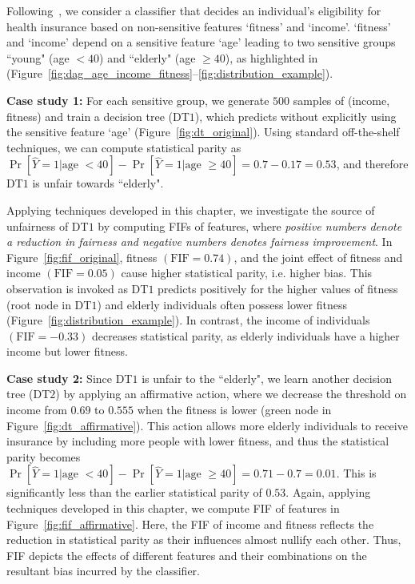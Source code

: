 \begin{example}
	\normalfont
	\label{ex:motivating_example}
 Following~\cite{ghosh2020justicia}, we consider a classifier that decides an individual's eligibility for health insurance based on non-sensitive features `fitness' and `income'.
	`fitness' and `income' depend on a sensitive feature `age' leading to two sensitive groups ``young" (age $ < 40 $) and ``elderly" (age $ \ge 40 $), as highlighted in (Figure~\ref{fig:dag_age_income_fitness}--\ref{fig:distribution_example}). 
	
	\textbf{Case study 1:} For each sensitive group, we generate $ 500 $ samples of (income, fitness) and train a decision tree (DT$ 1 $), which predicts without explicitly using the sensitive feature `age' (Figure~\ref{fig:dt_original}). %
	Using standard off-the-shelf techniques, we can compute statistical parity as $ \Pr[\widehat{Y} = 1 | \text{age } < 40] - \Pr[\widehat{Y} = 1 | \text{age } \ge 40] = 0.7 - 0.17 = 0.53 $, and therefore DT$ 1 $ is unfair towards ``elderly".
	
	Applying techniques developed in this chapter, we  investigate the source of unfairness of DT$ 1 $ by computing FIFs of features, where \emph{positive numbers denote a reduction in fairness and negative numbers denotes fairness improvement}. In Figure~\ref{fig:fif_original}, fitness $(\mathrm{FIF} = 0.74)$, and the joint effect of fitness and income $(\mathrm{FIF}  = 0.05)$ cause higher statistical parity, i.e. higher bias. This observation is invoked as DT$ 1 $ predicts positively for the higher values of fitness (root node in DT$ 1 $) and elderly individuals often possess lower fitness (Figure~\ref{fig:distribution_example}). In contrast, the income of individuals  $(\mathrm{FIF}  = -0.33)$ decreases statistical parity, as elderly individuals have a higher income but lower fitness.
	
	\textbf{Case study 2:} Since DT$ 1 $ is unfair to the ``elderly", we learn another decision tree (DT$ 2 $) by applying an affirmative action, where we decrease the threshold on income from $ 0.69 $ to $ 0.555 $ when the fitness is lower ({\color{affirmative}green} node in Figure~\ref{fig:dt_affirmative}). This action allows more elderly individuals to receive insurance by including more people with lower fitness, and thus the statistical parity becomes $ \Pr[\widehat{Y} = 1 | \text{age } < 40] - \Pr[\widehat{Y} = 1 | \text{age } \ge 40] = 0.71 - 0.7 = 0.01$. This is significantly less than the earlier statistical parity of $ 0.53 $.	Again, applying techniques developed in this chapter, we compute FIF of features in Figure~\ref{fig:fif_affirmative}. Here, the FIF of income and fitness reflects the reduction in statistical parity as their influences almost nullify each other. Thus, FIF depicts the effects of different features and their combinations on the resultant bias incurred by the classifier. %
\end{example}


